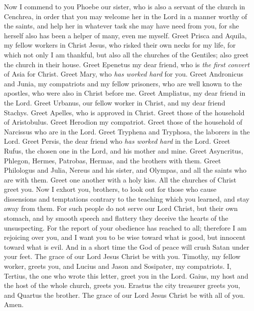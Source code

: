 \begin{biblechapter} %
 Now I commend to you Phoebe our sister, who is also a servant of the church in Cenchrea,
\verse in order that you may welcome her in the Lord in a manner worthy of the saints, and help her in whatever task she may have need from you, for she herself also has been a helper of many, even me myself.
\verse Greet Prisca and Aquila, my fellow workers in Christ Jesus,
\verse who risked their own necks for my life, for which not only I am thankful, but also all the churches of the Gentiles;
\verse also greet the church in their house. Greet Epenetus my dear friend, who is \textit{the first convert} of Asia for Christ.
\verse Greet Mary, who \textit{has worked hard} for you.
\verse Greet Andronicus and Junia, my compatriots and my fellow prisoners, who are well known to the apostles, who were also in Christ before me.
\verse Greet Ampliatus, my dear friend in the Lord.
\verse Greet Urbanus, our fellow worker in Christ, and my dear friend Stachys.
\verse Greet Apelles, who is approved in Christ. Greet those of the household of Aristobulus.
\verse Greet Herodion my compatriot. Greet those of the household of Narcissus who are in the Lord.
\verse Greet Tryphena and Tryphosa, the laborers in the Lord. Greet Persis, the dear friend who \textit{has worked hard} in the Lord.
\verse Greet Rufus, the chosen one in the Lord, and his mother and mine.
\verse Greet Asyncritus, Phlegon, Hermes, Patrobas, Hermas, and the brothers with them.
\verse Greet Philologus and Julia, Nereus and his sister, and Olympas, and all the saints who are with them.
\verse Greet one another with a holy kiss. All the churches of Christ greet you.
 Now I exhort you, brothers, to look out for those who cause dissensions and temptations contrary to the teaching which you learned, and stay away from them.
\verse For such people do not serve our Lord Christ, but their own stomach, and by smooth speech and flattery they deceive the hearts of the unsuspecting.
\verse For the report of your obedience has reached to all; therefore I am rejoicing over you, and I want you to be wise toward what is good, but innocent toward what is evil.
\verse And in a short time the God of peace will crush Satan under your feet. The grace of our Lord Jesus Christ be with you.
 Timothy, my fellow worker, greets you, and Lucius and Jason and Sosipater, my compatriots.
\verse I, Tertius, the one who wrote this letter, greet you in the Lord.
\verse Gaius, my host and the host of the whole church, greets you. Erastus the city treasurer greets you, and Quartus the brother.
 The grace of our Lord Jesus Christ be with all of you. Amen.
\end{biblechapter}

